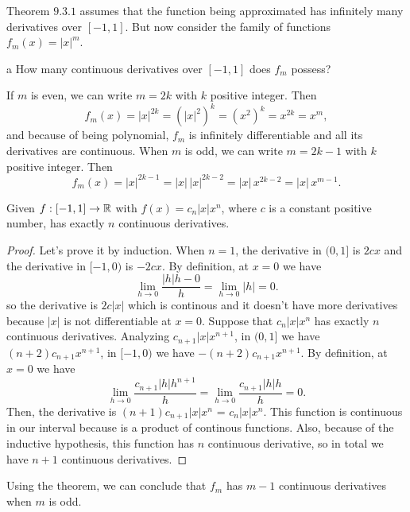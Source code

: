 \begin{statement}{7}
  Theorem $9.3.1$ assumes that the function being approximated has
  infinitely many derivatives over $[-1, 1]$. But now consider the family of functions
  $f_m(x) = |x|^m$.
\end{statement}

\begin{statement}{a}
  How many continuous derivatives over $[-1, 1]$ does $f_m$ possess?
\end{statement}

\begin{solution}
  If $m$ is even, we can write $m = 2k$ with $k$ positive integer.
  Then
  \[
    f_m(x) = |x|^{2k} = (|x|^2)^k = (x^2)^k = x^{2k} = x^m,
  \]
  and because of being polynomial, $f_m$ is infinitely differentiable
  and all its derivatives are continuous.
  When $m$ is odd, we can write $m = 2k - 1$ with $k$ positive integer.
  Then
  \[
    f_m(x)= |x|^{2k - 1} = |x| \, |x|^{2k - 2} = |x| \, x^{2k - 2} = |x| \, x^{m - 1}.
  \]

  \begin{theorem}
    Given $f: [-1, 1] \to \mathbb{R}$ with $f(x) = c_n |x| x^n$,
    where $c$ is a constant positive number, has exactly $n$ continuous derivatives.
  \end{theorem}
  
  \begin{proof}
    Let's prove it by induction.
    When $n = 1$, the derivative in $(0, 1]$ is $2cx$ and
    the derivative in $[-1, 0)$ is $-2cx$. By definition, at $x = 0$ we have
    \[
      \lim_{h \to 0} \frac{|h|h - 0}{h} = \lim_{h \to 0} |h| = 0.
    \]
    so the derivative is $2c|x|$ which is continous and it doesn't have
    more derivatives because $|x|$ is not differentiable at $x = 0$.
    Suppose that $c_n |x| x^n$ has exactly $n$ continuous derivatives.
    Analyzing $c_{n + 1}|x| x^{n + 1}$, in $(0, 1]$ we have
    $(n + 2) c_{n + 1} x^{n + 1}$,
    in $[-1, 0)$ we have $-(n + 2) c_{n + 1} x^{n + 1}$. By definition, at $x = 0$ we have
    \[
      \lim_{h \to 0} \frac{c_{n + 1} |h|h^{n + 1}}{h} = \lim_{h \to 0} \frac{c_{n + 1} |h|h}{h} = 0.
    \]
    Then, the derivative is $(n + 1)c_{n + 1}|x|x^n$ = $c_n |x| x^n$. This function is continuous
    in our interval because is a product of continous functions. Also, because of the inductive
    hypothesis, this function has $n$ continuous derivative, so in total we have $n + 1$ continuous
    derivatives.
  \end{proof}

  Using the theorem, we can conclude that $f_m$ has $m - 1$ continuous derivatives when $m$ is odd.
\end{solution}

